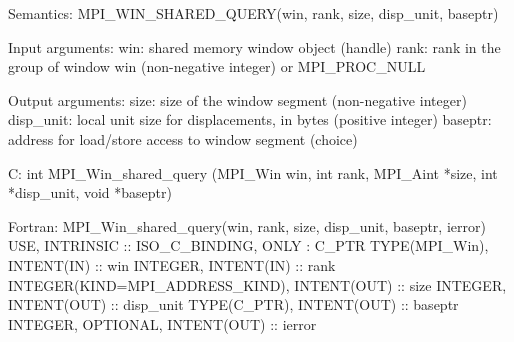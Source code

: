 Semantics:
MPI_WIN_SHARED_QUERY(win, rank, size, disp_unit, baseptr)

Input arguments:
win:  shared memory window object (handle)
rank: rank in the group of window win (non-negative integer)
      or MPI_PROC_NULL

Output arguments:
size: size of the window segment (non-negative integer)
disp_unit: local unit size for displacements, 
           in bytes (positive integer)
baseptr: address for load/store access to window segment (choice)

C:
int MPI_Win_shared_query
   (MPI_Win win, int rank, MPI_Aint *size, int *disp_unit,
    void *baseptr)

Fortran:
MPI_Win_shared_query(win, rank, size, disp_unit, baseptr, ierror)
USE, INTRINSIC :: ISO_C_BINDING, ONLY : C_PTR
TYPE(MPI_Win), INTENT(IN) :: win
INTEGER, INTENT(IN) :: rank
INTEGER(KIND=MPI_ADDRESS_KIND), INTENT(OUT) :: size
INTEGER, INTENT(OUT) :: disp_unit
TYPE(C_PTR), INTENT(OUT) :: baseptr
INTEGER, OPTIONAL, INTENT(OUT) :: ierror 
